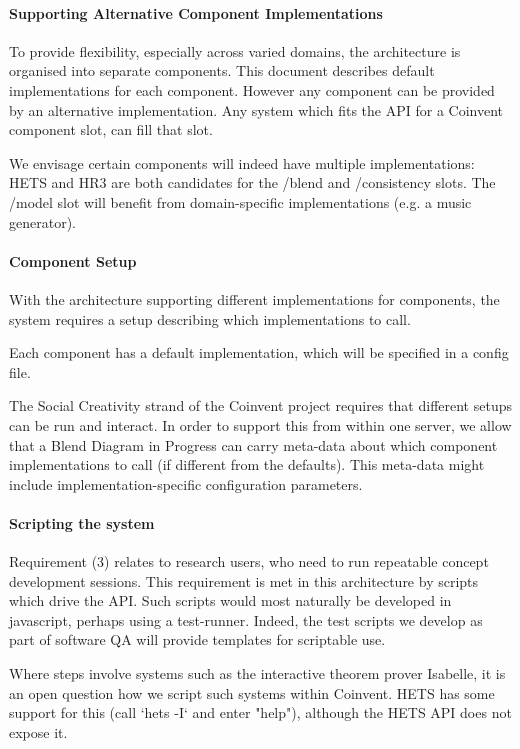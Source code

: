 \documentclass[a4paper,twoside,11pt]{article}
\begin{document}
\paragraph{Supporting Alternative Component Implementations}

To provide flexibility, especially across varied domains, the architecture is organised into separate
components. This document describes default implementations for each component.
However any component can be provided by an alternative implementation. Any system which fits the API for a Coinvent component slot, can fill that slot.

We envisage certain components will indeed have multiple implementations: HETS and HR3 are both candidates for the /blend and /consistency slots. The /model slot will benefit from domain-specific implementations (e.g. a music generator).

\paragraph{Component Setup}

With the architecture supporting different implementations for components, the system
requires a setup describing which implementations to call.

Each component has a default implementation, which will be specified in a config file.

The Social Creativity strand of the Coinvent project requires that different setups
can be run and interact. In order to support this from within one server, we allow
that a Blend Diagram in Progress can carry meta-data about which component implementations to call (if different from the defaults). This meta-data might include implementation-specific configuration parameters.

\paragraph{Scripting the system}

Requirement (3) relates to research users, who need to run repeatable concept development sessions. This requirement is met in this architecture by scripts which drive the API. Such scripts would most naturally be developed in javascript, perhaps using a test-runner. Indeed, the test scripts we develop as part of software QA will provide templates for scriptable use.

Where steps involve systems such as the interactive theorem prover Isabelle, it is an open question how we script such systems within Coinvent. HETS
has some support for this (call `hets -I` and enter "help"), 
although the HETS API does not expose it.
\end{document}

